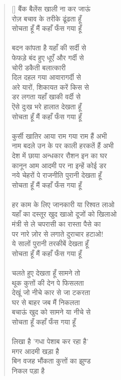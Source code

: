 \begin{verse}[\versewidth]
{बैंक बैलेंस खाली ना कर जाऊं\\
रोज़ बचाव के तरीके ढूंढता हूँ\\
सोचता हूँ मैं कहाँ फँस गया हूँ\\
\\
बदन कांपता है यहाँ की सर्दी से\\
फेफड़े बंद हुए धूएँ और गर्दी से\\
चोरी डकैती बलात्कारी\\
दिल दहल गया आवारागर्दी से\\
अरे यारों, शिकायत करें किस से\\
डर लगता यहाँ खाकी वर्दी से\\
ऎसे दुःख भरे हालात देखता हूँ\\
सोचता हूँ मैं कहाँ फँस गया हूँ\\
\\
कुर्सी खातिर आया राम गया राम हैं अभी\\
नाम बदले उन के पर काली हरकतें हैं अभी\\
देश में छाया अन्धकार रौशन इन का घर\\
कानून आम आदमी पर ना इन्हें कोई डर\\
नये चेहरों पे राजनीति पुरानी देखता हूँ\\
सोचता हूँ मैं कहाँ फँस गया हूँ\\
\\
हर काम के लिए जानकारी या रिश्वत लाओ\\
यहाँ का दस्तूर खुद खाओ दूजों को खिलाओ \\
मंत्री से ले चपरासी का रास्ता पैसे का\\
पर नारे ज़ोर से लगाते दुराचार हटाओ!\\
ये सालों पुरानी तरकीबें देखता हूँ\\
सोचता हूँ मैं कहाँ फँस गया हूँ\\
\\
चलते हुए देखता हूँ सामने तो\\
थूक कुत्तों की देन पे फिसलता\\
देखूं जो नीचे कार से जा टकरता\\
घर से बाहर जब मैं निकलता\\
बचाऊं खुद को सामने या नीचे से\\
सोचता हूँ कहाँ फँस गया हूँ\\
\\
लिखा है 'गधा पेशाब कर रहा है' \\
मगर आदमी खड़ा है\\
बिन वजह भौंकता कुत्तों का झुण्ड \\
निकल पड़ा है\\
}
\end{verse}
